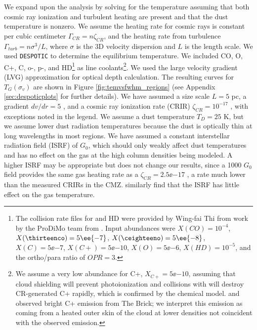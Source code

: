 We expand upon the \citet{Ao2013a} analysis by solving for the temperature
assuming that both cosmic ray ionization and turbulent heating are present and
that the dust temperature is nonzero.  We assume the heating rate for cosmic
rays is constant per cubic centimeter $\Gamma_{CR} = n \zeta_{CR}$, and the
heating rate from turbulence $\Gamma_{turb} = n \sigma^3 / L$, where $\sigma$
is the 3D velocity dispersion and $L$ is the length scale.  We used
\texttt{DESPOTIC} \citep{Krumholz2014c} to determine the equilibrium
temperature.  We included CO, O, C+, C, o-\hh, p-\hh, and HD\footnote{The
collision rate files for \hh and HD were provided by Wing-fai Thi from work by
the ProDiMo team from \citet{Le-Bourlot1999a, Wrathmall2007a, Flower2000a,
Wolniewicz1998a}.
Input abundances were $X(CO)=10^{-4}$, $X(\thirteenco)=5\ee{-7}$,
$X(\ceighteeno)=5\ee{-8}$, $X(C)=5\ee{-7}$, $X(C+)=5\ee{-10}$, $X(O)=5\ee{-6}$,
$X(HD)=10^{-5}$, and the ortho/para ratio of \hh $OPR=3$.} as line
coolants\footnote{We assume a very low abundance for C+, $X_{C+}=5\ee{-10}$,
assuming that cloud shielding will prevent photoionization and collisions with
\hh will destroy CR-generated C+ rapidly, which is confirmed by the
\citet{Nelson1999a} chemical model.  \citet{Lis1998a} and \citet{Lis1999a}
observed bright C+ emission from The Brick; we interpret this emission as
coming from a heated outer skin of the cloud at lower densities not coincident
with the observed \formaldehyde emission.}.  We used the large velocity
gradient (LVG) approximation for optical depth calculation.  The resulting
curves for $T_G(\sigma_v)$ are shown in Figure \ref{fig:temvsfwhm_regions} (see
Appendix \ref{sec:despoticplots} for further details).  We
have assumed a size scale $L=5$ pc, a gradient $dv/dr = 5$ \kms \perpc, and a
cosmic ray ionization rate (CRIR) $\zeta_{CR}=10^{-17}$ \pers, with exceptions
noted in the legend.  We assume a dust temperature $T_D=25$ K, but we assume
lower dust radiation temperatures because the dust is optically thin at long
wavelengths in most regions.  We have assumed a constant interstellar radiation
field (ISRF) of $G_0$, which should only weakly affect dust temperatures and
has no effect on the gas at the high column densities being modeled.  A higher
ISRF may be appropriate but does not change our results, since a 1000 $G_0$
field provides the same gas heating rate as a $\zeta_{CR}=2.5\ee{-17}$ \pers,
a rate much lower than the measured CRIRs in the CMZ.
\citet{Clark2013a} similarly find that the ISRF has little effect on the gas
temperature.


